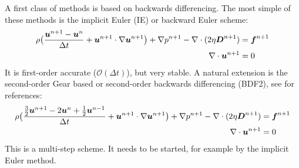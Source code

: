 A first class of methods is based on backwards differencing.
The most simple of these methods is the implicit Euler (IE) or backward Euler scheme:
\begin{align}
 \rho \big( \frac{\boldsymbol{u}^{n+1}-\boldsymbol{u}^n}{\Delta t} +
     \boldsymbol{u}^{n+1} \cdot \nabla \boldsymbol{u}^{n+1} \big) + \nabla p^{n+1} 
         - \nabla \cdot ( 2 \eta \boldsymbol{D}^{n+1}) &=\boldsymbol{f}^{n+1} \\
\nabla \cdot \boldsymbol{u}^{n+1} &= 0
\end{align} 
It is first-order accurate ($\mathcal{O}(\Delta t)$), but very stable. A
natural extension is the second-order Gear based or second-order backwards
differencing (BDF2), see \cite{Hulsen96} for references:
\begin{align}
 \rho \big( \frac{\frac32\boldsymbol{u}^{n+1}-2\boldsymbol{u}^n+\frac12\boldsymbol{u}^{n-1}}{\Delta t} +
     \boldsymbol{u}^{n+1} \cdot \nabla \boldsymbol{u}^{n+1} \big) + \nabla p^{n+1} 
         - \nabla \cdot ( 2 \eta \boldsymbol{D}^{n+1}) &=\boldsymbol{f}^{n+1} \\
\nabla \cdot \boldsymbol{u}^{n+1} &= 0
\end{align} 
This is a multi-step scheme. It needs to be started, for example by the implicit Euler method.

